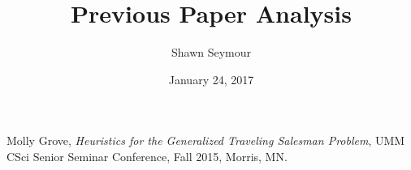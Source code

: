 \documentclass[12pt,letterpaper]{article}
\title{Previous Paper Analysis}
\date{January 24, 2017}
\author{Shawn Seymour}
\begin{document}
\maketitle



\newpage

\begin{thebibliography}{9}

	Molly Grove,
	\emph{Heuristics for the Generalized Traveling Salesman Problem},
	UMM CSci Senior Seminar Conference, Fall 2015, Morris, MN.

\end{thebibliography}
\end{document}
